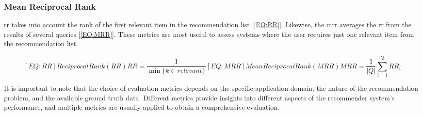 \subsubsection{Mean Reciprocal Rank}

\ac{rr} takes into account the rank of the first relevant item in the recommendation list [\ref{EQ:RR}]. Likewise, the \ac{mrr} averages the \acl{rr} from the results of several queries [\ref{EQ:MRR}]. These metrics are most useful to assess systems where the user requires just one relevant item from the recommendation list.

\begin{multicols}{2}
    \begin{subequations}
        \begin{equation}[EQ:RR]{Reciprocal Rank (RR)}
            RR=\frac{1}{\min\{k\in relevant\}}
        \end{equation}
        \begin{equation}[EQ:MRR]{Mean Reciprocal Rank (MRR)}
            MRR=\frac{1}{|Q|}\sum_{i=1}^{|Q|}RR_i
        \end{equation}
    \end{subequations}
\end{multicols}

It is important to note that the choice of evaluation metrics depends on the specific application domain, the nature of the recommendation problem, and the available ground truth data. Different metrics provide insights into different aspects of the recommender system's performance, and multiple metrics are usually applied to obtain a comprehensive evaluation.